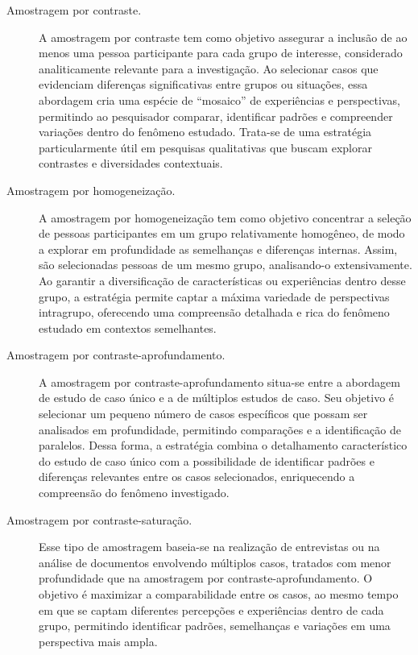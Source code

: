 \documentclass[12pt, a4paper, openany]{book}
\begin{document}
\begin{description}
\item[Amostragem por contraste.] A amostragem por contraste tem como objetivo assegurar a inclus\~ao de ao menos uma pessoa participante para cada grupo de interesse, considerado analiticamente relevante para a investiga\c{c}\~ao. Ao selecionar casos que evidenciam diferen\c{c}as significativas entre grupos ou situa\c{c}\~oes, essa abordagem cria uma esp\'ecie de ``mosaico'' de experi\^encias e perspectivas, permitindo ao pesquisador comparar, identificar padr\~oes e compreender varia\c{c}\~oes dentro do fen\^omeno estudado. Trata-se de uma estrat\'egia particularmente \'util em pesquisas qualitativas que buscam explorar contrastes e diversidades contextuais.

\item[Amostragem por homogeneiza\c{c}\~ao.] A amostragem por homogeneiza\c{c}\~ao tem como objetivo concentrar a sele\c{c}\~ao de pessoas participantes em um grupo relativamente homog\^eneo, de modo a explorar em profundidade as semelhan\c{c}as e diferen\c{c}as internas. Assim, s\~ao selecionadas pessoas de um mesmo grupo, analisando-o extensivamente. Ao garantir a diversifica\c{c}\~ao de caracter\'isticas ou experi\^encias dentro desse grupo, a estrat\'egia permite captar a m\'axima variedade de perspectivas intragrupo, oferecendo uma compreens\~ao detalhada e rica do fen\^omeno estudado em contextos semelhantes.

\item[Amostragem por contraste-aprofundamento.] A amostragem por contraste-aprofundamento situa-se entre a abordagem de estudo de caso \'unico e a de m\'ultiplos estudos de caso. Seu objetivo \'e selecionar um pequeno n\'umero de casos espec\'ificos que possam ser analisados em profundidade, permitindo compara\c{c}\~oes e a identifica\c{c}\~ao de paralelos. Dessa forma, a estrat\'egia combina o detalhamento caracter\'istico do estudo de caso \'unico com a possibilidade de identificar padr\~oes e diferen\c{c}as relevantes entre os casos selecionados, enriquecendo a compreens\~ao do fen\^omeno investigado.

\item[Amostragem por contraste-satura\c{c}\~ao.] Esse tipo de amostragem baseia-se na realiza\c{c}\~ao de entrevistas ou na an\'alise de documentos envolvendo m\'ultiplos casos, tratados com menor profundidade que na amostragem por contraste-aprofundamento. O objetivo \'e maximizar a comparabilidade entre os casos, ao mesmo tempo em que se captam diferentes percep\c{c}\~oes e experi\^encias dentro de cada grupo, permitindo identificar padr\~oes, semelhan\c{c}as e varia\c{c}\~oes em uma perspectiva mais ampla.
\end{description}
\end{document}
